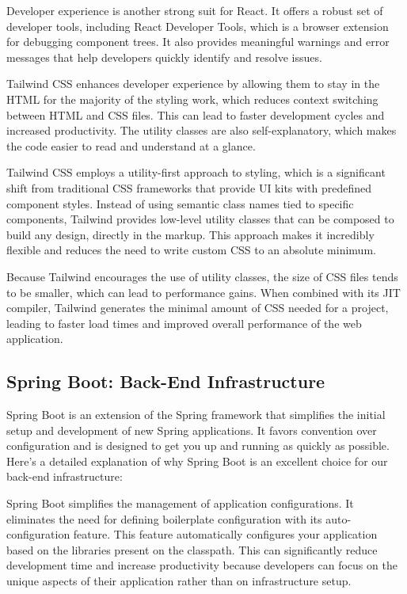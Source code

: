 Developer experience is another strong suit for React. It offers a robust set of developer tools, including React Developer Tools, which is a browser extension for debugging component trees. 
It also provides meaningful warnings and error messages that help developers quickly identify and resolve issues.

Tailwind CSS enhances developer experience by allowing them to stay in the HTML for the majority of the styling work, which reduces context switching between HTML and CSS files. 
This can lead to faster development cycles and increased productivity. The utility classes are also self-explanatory, which makes the code easier to read and understand at a glance.

Tailwind CSS employs a utility-first approach to styling, which is a significant shift from traditional CSS frameworks that provide UI kits with predefined component styles. 
Instead of using semantic class names tied to specific components, Tailwind provides low-level utility classes that can be composed to build any design, directly in the markup. This approach makes it incredibly flexible and reduces the need to write custom CSS to an absolute minimum.

Because Tailwind encourages the use of utility classes, the size of CSS files tends to be smaller, which can lead to performance gains. 
When combined with its JIT compiler, Tailwind generates the minimal amount of CSS needed for a project, leading to faster load times and improved overall performance of the web application.

\subsection{Spring Boot: Back-End Infrastructure}
Spring Boot is an extension of the Spring framework that simplifies the initial setup and development of new Spring applications.\cite{springboot2023} 
It favors convention over configuration and is designed to get you up and running as quickly as possible. Here's a detailed explanation of why Spring Boot is an excellent choice for our back-end infrastructure:

Spring Boot simplifies the management of application configurations. 
It eliminates the need for defining boilerplate configuration with its auto-configuration feature.
This feature automatically configures your application based on the libraries present on the classpath. 
This can significantly reduce development time and increase productivity because developers can focus on the unique aspects of their application rather than on infrastructure setup. 

